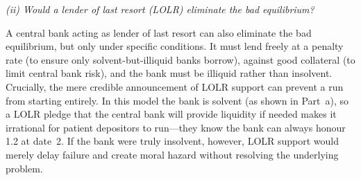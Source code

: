 \documentclass[a4paper]{article}
\begin{document}
\medskip
\textit{(ii) Would a lender of last resort (LOLR) eliminate the bad
equilibrium?}

A central bank acting as lender of last resort can also eliminate the bad
equilibrium, but only under specific conditions. It must lend freely at a
penalty rate (to ensure only solvent-but-illiquid banks borrow), against
good collateral (to limit central bank risk), and the bank must be illiquid
rather than insolvent. Crucially, the mere credible announcement of LOLR
support can prevent a run from starting entirely. In this model the bank is
solvent (as shown in Part~a), so a LOLR pledge that the central bank will
provide liquidity if needed makes it irrational for patient depositors to
run---they know the bank can always honour 1.2 at date~2. If the bank were
truly insolvent, however, LOLR support would merely delay failure and create
moral hazard without resolving the underlying problem.
\end{document}
